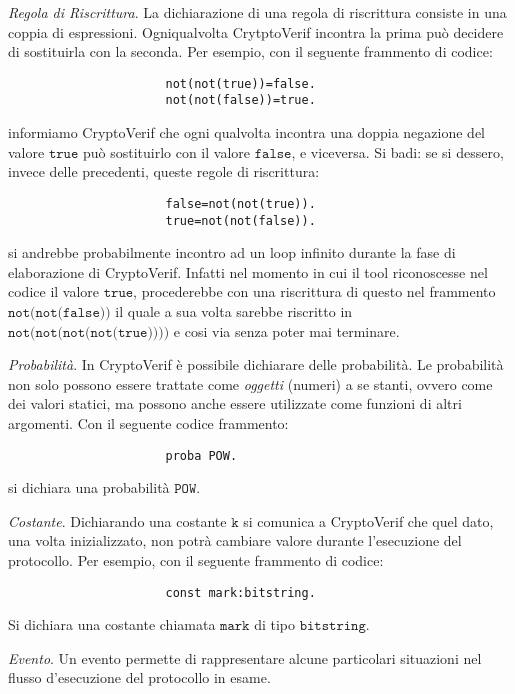 \documentclass[a4paper,openright,twoside,12pt]{report}
\begin{document}
\begin{description}
 \item{\emph{Regola di Riscrittura}.} La dichiarazione di una regola di riscrittura consiste in una coppia di espressioni. Ogniqualvolta CrytptoVerif incontra la prima
			      pu\`o decidere di sostituirla con la seconda. Per esempio, con il seguente frammento di codice:
      				      \begin{verbatim}
				      not(not(true))=false.
				      not(not(false))=true.
				      \end{verbatim}
informiamo CryptoVerif che ogni qualvolta incontra una doppia negazione del valore $\texttt{true}$ pu\`o sostituirlo con il valore $\texttt{false}$, e viceversa. 
Si badi: se si dessero, invece delle precedenti, queste regole di riscrittura:
				      \begin{verbatim}
				      false=not(not(true)).
				      true=not(not(false)).
				      \end{verbatim}
si andrebbe probabilmente incontro ad un loop infinito durante la fase di elaborazione di CryptoVerif. Infatti nel momento in cui il tool riconoscesse nel codice il valore $\texttt{true}$, 
procederebbe con una riscrittura di questo nel frammento $\texttt{not(not(false))}$ il quale a sua volta sarebbe riscritto in $\texttt{not(not(not(not(true))))}$ e cosi via senza poter mai terminare.
 \item{\emph{Probabilit\`a}.} In CryptoVerif \`e possibile dichiarare delle probabilit\`a. Le probabilit\`a non solo possono essere trattate come \emph{oggetti} (numeri) 
		      a se stanti, ovvero come dei valori statici, ma possono anche essere utilizzate come funzioni di altri argomenti. Con il seguente codice frammento:
				      \begin{verbatim}
				      proba POW.
				      \end{verbatim}
si dichiara una probabilit\`a $\texttt{POW}$. 
 \item{\emph{Costante}.} Dichiarando una costante $\texttt{k}$ si comunica a CryptoVerif che quel dato, una volta inizializzato, non potr\`a cambiare valore durante l'esecuzione del protocollo. Per esempio, con il seguente frammento di codice:
				      \begin{verbatim}
				      const mark:bitstring.
				      \end{verbatim}
	Si dichiara una costante chiamata $\texttt{mark}$ di tipo $\texttt{bitstring}$.
 \item{\emph{Evento}.} Un evento permette di rappresentare alcune particolari situazioni nel flusso d'esecuzione del protocollo in esame. 

\end{description}
\end{document}
